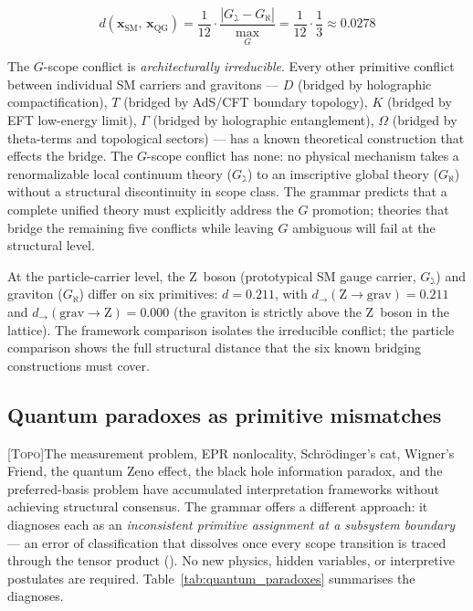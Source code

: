 \documentclass[12pt,a4paper]{article}
\newcommand{\TOPO}{\textsc{[Topo]}}
\begin{document}
\begin{equation}
  d(\mathbf{x}_\text{SM},\, \mathbf{x}_\text{QG})
  = \frac{1}{12} \cdot \frac{|G_\gimel - G_\aleph|}{\max_G}
  = \frac{1}{12} \cdot \frac{1}{3}
  \approx 0.0278
  \label{eq:smqg_distance}
\end{equation}

The $G$-scope conflict is \emph{architecturally irreducible}. Every
other primitive conflict between individual SM carriers and gravitons
--- $D$ (bridged by holographic compactification), $T$ (bridged by
AdS/CFT boundary topology), $K$ (bridged by EFT low-energy limit),
$\Gamma$ (bridged by holographic entanglement), $\Omega$ (bridged by
theta-terms and topological sectors) --- has a known theoretical
construction that effects the bridge. The $G$-scope conflict has none:
no physical mechanism takes a renormalizable local continuum theory
($G_\gimel$) to an imscriptive global theory ($G_\aleph$) without a
structural discontinuity in scope class. The grammar predicts that a
complete unified theory must explicitly address the $G$ promotion; theories
that bridge the remaining five conflicts while leaving $G$ ambiguous
will fail at the structural level.

At the particle-carrier level, the Z~boson (prototypical SM gauge
carrier, $G_\gimel$) and graviton ($G_\aleph$) differ on six
primitives: $d = 0.211$, with $d_\to(\text{Z} \to \text{grav}) = 0.211$
and $d_\to(\text{grav} \to \text{Z}) = 0.000$ (the graviton is strictly
above the Z~boson in the lattice). The framework comparison isolates
the irreducible conflict; the particle comparison shows the full
structural distance that the six known bridging constructions must cover.

\subsection{Quantum paradoxes as primitive mismatches}
\label{sec:quantum_paradoxes}

\TOPO\quad The measurement problem, EPR nonlocality, Schrödinger's cat, Wigner's
Friend, the quantum Zeno effect, the black hole information paradox, and the
preferred-basis problem have accumulated interpretation frameworks without
achieving structural consensus. The grammar offers a different approach: it
diagnoses each as an \emph{inconsistent primitive assignment at a subsystem
boundary} --- an error of classification that dissolves once every scope transition
is traced through the tensor product ().
No new physics, hidden variables, or interpretive postulates are required.
Table~\ref{tab:quantum_paradoxes} summarises the diagnoses.
\end{document}
